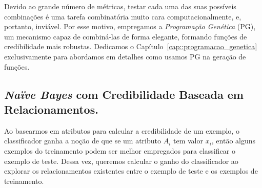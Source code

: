 Devido ao grande número de métricas, testar cada uma das suas possíveis combinações é uma tarefa combinatória muito cara computacionalmente, e, portanto, inviável. Por esse motivo, empregamos a \textit{Programação Genética} (\textsc{PG}), um mecanismo capaz de combiná-las de forma elegante, formando funções de credibilidade mais robustas. Dedicamos o Capítulo~\ref{cap::programacao_genetica} exclusivamente para abordamos em detalhes como usamos \textsc{PG} na geração de funções.










\subsection{\textit{Naïve Bayes} com Credibilidade Baseada em Relacionamentos.}
\label{subsubsec::nbcredgrafos}

Ao basearmos em atributos para calcular a credibilidade de um exemplo, o classificador ganha a noção de que se um atributo $A_i$ tem valor $x_i$, então alguns exemplos do treinamento podem ser melhor empregados para classificar o exemplo de teste.
Dessa vez, queremos calcular o ganho do classificador ao explorar os relacionamentos existentes entre o exemplo de teste e os exemplos de treinamento. 

